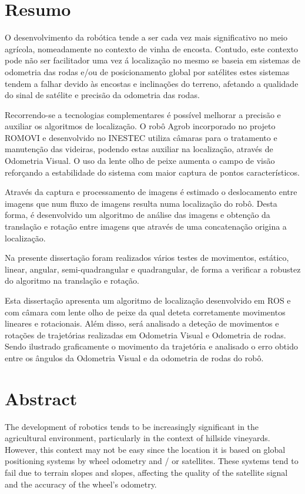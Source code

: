 \chapter*{Resumo}



O desenvolvimento da robótica tende a ser cada vez mais significativo no meio agrícola, nomeadamente no contexto de vinha de encosta. Contudo, este contexto pode não ser facilitador uma vez á localização no mesmo se baseia em sistemas de odometria das rodas e/ou de posicionamento global por satélites estes sistemas tendem a falhar devido às encostas  e inclinações do terreno, afetando a qualidade do sinal de satélite e precisão da odometria das rodas.

Recorrendo-se a  tecnologias complementares é possível melhorar a precisão e auxiliar os algoritmos de localização. O robô Agrob incorporado no projeto ROMOVI e desenvolvido no INESTEC  utiliza câmaras para o tratamento e manutenção das videiras, podendo estas auxiliar na localização, através de Odometria Visual. O uso da lente olho de peixe aumenta o campo de visão reforçando a estabilidade do sistema com maior captura de pontos característicos.

Através da captura e processamento de imagens é estimado o deslocamento entre imagens que num fluxo de imagens resulta numa localização do robô. Desta forma, é desenvolvido um algoritmo de análise das imagens e obtenção da translação e rotação entre imagens que através de uma concatenação origina a localização.

Na presente dissertação foram realizados vários testes de movimentos, estático, linear, angular, semi-quadrangular e quadrangular, de forma a verificar a robustez do algoritmo na translação e rotação.

Esta dissertação apresenta um algoritmo de localização desenvolvido em ROS e com câmara com lente olho de peixe da qual deteta corretamente movimentos lineares e rotacionais. Além disso, será analisado  a deteção de movimentos e rotações de trajetórias realizadas em Odometria Visual e Odometria de rodas. Sendo ilustrado graficamente o movimento da trajetória e analisado o erro obtido entre os ângulos da Odometria Visual e da odometria de rodas do robô.

\chapter*{Abstract}


The development of robotics tends to be increasingly significant in the agricultural environment, particularly in the context of hillside vineyards. However, this context may not be easy since the location it is based on global positioning systems by wheel odometry and / or satellites. These systems tend to fail due to terrain slopes and slopes, affecting the quality of the satellite signal and the accuracy of the wheel's odometry.

